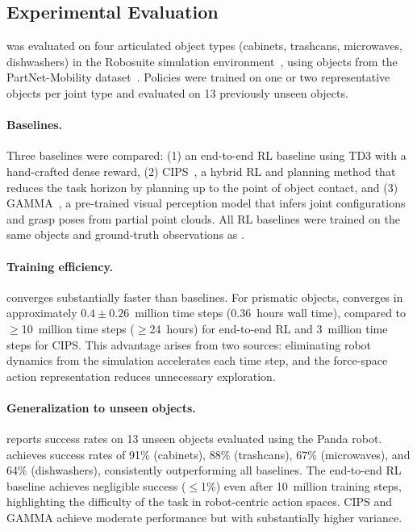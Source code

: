 \subsection{Experimental Evaluation}
\label{sec:flex_results}

\FLEX{} was evaluated on four articulated object types (cabinets, trashcans, microwaves, dishwashers) in the Robosuite simulation environment~\citep{zhu2020robosuite}, using objects from the PartNet-Mobility dataset~\citep{xiang2020sapien}. Policies were trained on one or two representative objects per joint type and evaluated on 13 previously unseen objects.

\paragraph{Baselines.} Three baselines were compared: (1) an end-to-end RL baseline using TD3 with a hand-crafted dense reward, (2) CIPS~\citep{rosen2022role}, a hybrid RL and planning method that reduces the task horizon by planning up to the point of object contact, and (3) GAMMA~\citep{yu2024gamma}, a pre-trained visual perception model that infers joint configurations and grasp poses from partial point clouds. All RL baselines were trained on the same objects and ground-truth observations as \FLEX{}.


\paragraph{Training efficiency.} \FLEX{} converges substantially faster than baselines. For prismatic objects, \FLEX{} converges in approximately $0.4 \pm 0.26$~million time steps (0.36~hours wall time), compared to $\geq$10~million time steps ($\geq$24~hours) for end-to-end RL and 3~million time steps for CIPS. This advantage arises from two sources: eliminating robot dynamics from the simulation accelerates each time step, and the force-space action representation reduces unnecessary exploration.

\paragraph{Generalization to unseen objects.}  reports success rates on 13 unseen objects evaluated using the Panda robot. \FLEX{} achieves success rates of 91\% (cabinets), 88\% (trashcans), 67\% (microwaves), and 64\% (dishwashers), consistently outperforming all baselines. The end-to-end RL baseline achieves negligible success ($\leq$1\%) even after 10~million training steps, highlighting the difficulty of the task in robot-centric action spaces. CIPS and GAMMA achieve moderate performance but with substantially higher variance.



